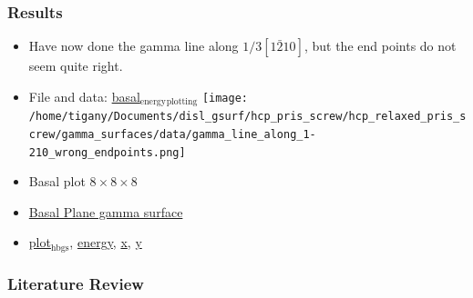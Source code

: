\documentclass[11pt]{article}
\begin{document}
\subsubsection{Results}
\label{sec-2-4-4}
\begin{itemize}
\item Have now done the gamma line along $1/3[1\bar{2}10]$, but the end points
do not seem quite right.
\item File and data: \href{file:///home/tigany/Documents/disl_gsurf/hcp_pris_screw/hcp_relaxed_pris_screw/gamma_surfaces/data/plot_hsbc_pkl.py}{basal$_{\text{energy}}$$_{\text{plotting}}$} \texttt{[image: /home/tigany/Documents/disl\_gsurf/hcp\_pris\_screw/hcp\_relaxed\_pris\_screw/gamma\_surfaces/data/gamma\_line\_along\_1-210\_wrong\_endpoints.png]}
\item Basal plot $8\times 8\times 8$
\item \href{file:///home/tigany/Documents/disl_gsurf/hcp_pris_screw/hcp_relaxed_pris_screw/gamma_surfaces/data/supercell_8-8-8/Figures/gamma_surface_8-8-8_basal_tbe.png}{Basal Plane gamma surface}
\item \href{file:///home/tigany/Documents/disl_gsurf/hcp_pris_screw/hcp_relaxed_pris_screw/gamma_surfaces/data/supercell_8-8-8/plot_hsbc_pkl.py}{plot$_{\text{hbgs}}$}, \href{file:///home/tigany/Documents/disl_gsurf/hcp_pris_screw/hcp_relaxed_pris_screw/gamma_surfaces/data/supercell_8-8-8/hgsBte888.pkl}{energy}, \href{file:///home/tigany/Documents/disl_gsurf/hcp_pris_screw/hcp_relaxed_pris_screw/gamma_surfaces/data/supercell_8-8-8/hgsBtx888.pkl\%20}{x}, \href{file:///home/tigany/Documents/disl_gsurf/hcp_pris_screw/hcp_relaxed_pris_screw/gamma_surfaces/data/supercell_8-8-8/hgsBty888.pkl\%20}{y}
\end{itemize}


\subsubsection{Literature Review}
\label{sec-2-4-5}
\end{document}
